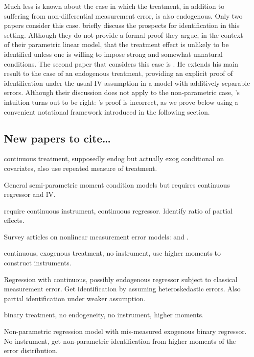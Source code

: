 Much less is known about the case in which the treatment, in addition to suffering from non-differential measurement error, is also endogenous.
Only two papers consider this case.
\cite{FL} briefly discuss the prospects for identification in this setting.
Although they do not provide a formal proof they argue, in the context of their parametric linear model, that the treatment effect is unlikely to be identified unless one is willing to impose strong and somewhat unnatural conditions. 
The second paper that considers this case is \cite{Mahajan}.
He extends his main result to the case of an endogenous treatment, providing an explicit proof of identification under the usual IV assumption in a model with additively separable errors.
Although their discussion does not apply to the non-parametric case, \citeauthor{FL}'s intuition turns out to be right: \citeauthor{Mahajan}'s proof is incorrect, as we prove below using a convenient notational framework introduced in the following section.

\subsection{New papers to cite\dots}
\cite{SongSchennachWhite} continuous treatment, supposedly endog but actually exog conditional on covariates, also use repeated measure of treatment.

\cite{song2015} General semi-parametric moment condition models but requires continuous regressor and IV. 

\cite{HuShiuWoutersen} require continuous instrument, continuous regressor. Identify ratio of partial effects.

Survey articles on nonlinear measurement error models: \cite{chensurvey} and \cite{SchennachSurvey}.

\cite{lewbel1997} continuous, exogenous treatment, no instrument, use higher moments to construct instruments.

\cite{lewbel2012} Regression with continuous, possibly endogenous regressor subject to classical measurement error. Get identification by assuming heteroskedastic errors.
Also partial identification under weaker assumption.

\cite{ChenHuLewbel} binary treatment, no endogeneity, no instrument, higher moments.

\cite{ChenHuLewbel2} Non-parametric regression model with mis-measured exogenous binary regressor. No instrument, get non-parametric identification from higher moments of the error distribution.


